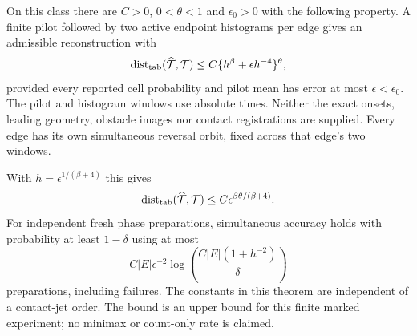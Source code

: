\begin{theorem}
\label{thm:tw-global}
On this class there are $C>0$, $0<\theta<1$ and $\epsilon_0>0$
with the following property. A finite pilot followed by two active
endpoint histograms per edge gives an admissible reconstruction with
\begin{equation}\label{eq:tw-global}
 \operatorname{dist}_{\rm tab}(\widehat{\mathcal T},\mathcal T)
 \le C\{h^\beta+\epsilon h^{-4}\}^{\theta},
\end{equation}
provided every reported cell probability and pilot mean has error at
most $\epsilon<\epsilon_0$. The pilot and histogram windows use
absolute times. Neither the exact onsets, leading geometry, obstacle
images nor contact registrations are supplied. Every edge has its own
simultaneous reversal orbit, fixed across that edge's two windows.

With $h=\epsilon^{1/(\beta+4)}$ this gives
\begin{equation}\label{eq:tw-rate}
 \operatorname{dist}_{\rm tab}(\widehat{\mathcal T},\mathcal T)
                  \le C\epsilon^{\beta\theta/(\beta+4)}.
\end{equation}
For independent fresh phase preparations, simultaneous accuracy holds
with probability at least $1-\delta$ using at most
\begin{equation}\label{eq:tw-budget}
 C|E|\epsilon^{-2}
       \log\left(\frac{C|E|(1+h^{-2})}{\delta}\right)
\end{equation}
preparations, including failures. The constants in this theorem are
independent of a contact-jet order. The bound is an upper bound for
this finite marked experiment; no minimax or count-only rate is claimed.
\end{theorem}
